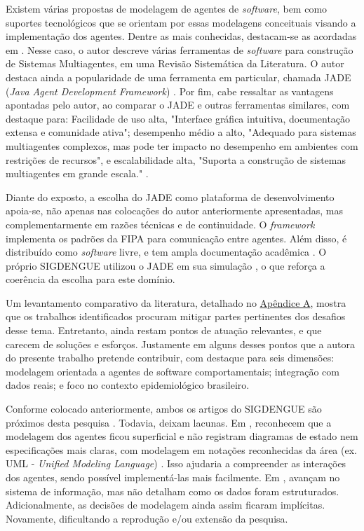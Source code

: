 Existem várias propostas de modelagem de agentes de \textit{software}, bem como suportes tecnológicos
que se orientam por essas modelagens conceituais visando a implementação dos agentes.
Dentre as mais conhecidas, destacam-se as acordadas em \cite{alhadef2024}. Nesse caso, o autor
descreve várias ferramentas de \textit{software} para construção de Sistemas Multiagentes, em uma
Revisão Sistemática da Literatura. O autor destaca ainda a popularidade de uma ferramenta
em particular, chamada JADE (\textit{Java Agent Development Framework}) \cite[p.~20]{alhadef2024}.
Por fim, cabe ressaltar as vantagens apontadas pelo autor, ao comparar o JADE e outras
ferramentas similares, com destaque para: Facilidade de uso alta, "Interface gráfica intuitiva,
documentação extensa e comunidade ativa"; desempenho médio a alto, "Adequado para sistemas 
multiagentes complexos, mas pode ter impacto no desempenho em ambientes com restrições de 
recursos", e escalabilidade alta, "Suporta a construção de sistemas multiagentes em grande 
escala." \cite[p.~36, Tabela~4]{alhadef2024}.

Diante do exposto, a escolha do JADE como plataforma de desenvolvimento apoia-se,
não apenas nas colocações do autor anteriormente apresentadas, mas complementarmente
em razões técnicas e de continuidade. O \textit{framework} implementa os padrões da FIPA para
comunicação entre agentes. Além disso, é distribuído como \textit{software} livre, e
tem ampla documentação acadêmica \cite{bellifemine2007}.
O próprio SIGDENGUE utilizou o JADE em sua simulação \cite{rizzi2011}, o que
reforça a coerência da escolha para este domínio.

Um levantamento comparativo da literatura, detalhado no \hyperref[ap-pesquisa-bibliografica]{Apêndice A}, mostra que
os trabalhos identificados procuram mitigar partes pertinentes dos desafios desse tema.
Entretanto, ainda restam pontos de atuação relevantes, e que carecem de soluções e esforços.
Justamente em alguns desses pontos que a autora do presente trabalho pretende contribuir,
com destaque para seis dimensões: modelagem orientada a agentes de software comportamentais;
integração com dados reais; e foco no contexto epidemiológico brasileiro.

Conforme colocado anteriormente, ambos os artigos do SIGDENGUE são próximos desta pesquisa
\cite{rizzi2011, rizzi2016}. Todavia, deixam lacunas. Em ,
reconhecem que a modelagem dos agentes ficou superficial e não registram diagramas de estado
nem especificações mais claras, com modelagem em notações reconhecidas da área
(ex. UML -  \textit{Unified Modeling Language}) \cite{fakhroutdinov2026}.
Isso ajudaria a compreender as interações dos agentes, sendo possível implementá-las mais facilmente.
Em , avançam no sistema de informação, mas não detalham como os dados foram estruturados.
Adicionalmente, as decisões de modelagem ainda assim ficaram implícitas.
Novamente, dificultando a reprodução e/ou extensão da pesquisa.

